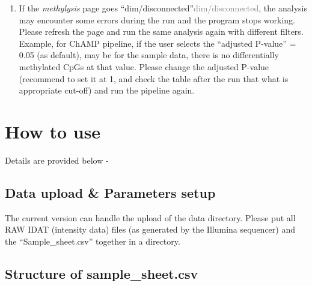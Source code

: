 \documentclass[
  a4paper,
  oneside,
  open=any]{scrreport}
\providecommand{\tightlist}{%
  \setlength{\itemsep}{0pt}\setlength{\parskip}{0pt}}\usepackage{longtable,booktabs,array}
\begin{document}
\begin{tcolorbox}[enhanced jigsaw, left=2mm, colback=white, breakable, leftrule=.75mm, coltitle=black, toprule=.15mm, rightrule=.15mm, colbacktitle=quarto-callout-tip-color!10!white, title=\textcolor{quarto-callout-tip-color}{\faLightbulb}\hspace{0.5em}{Tip}, opacitybacktitle=0.6, colframe=quarto-callout-tip-color-frame, bottomrule=.15mm, bottomtitle=1mm, toptitle=1mm, titlerule=0mm, opacityback=0, arc=.35mm]

\begin{enumerate}
\def\labelenumi{\arabic{enumi}.}
\setcounter{enumi}{1}
\tightlist
\item
  If the \emph{methylysis} page goes
  {``dim/disconnected''}\textcolor{gray}{dim/disconnected}, the analysis
  may encounter some errors during the run and the program stops
  working. Please refresh the page and run the same analysis again with
  different filters. Example, for ChAMP pipeline, if the user selects
  the ``adjusted P-value'' = 0.05 (as default), may be for the sample
  data, there is no differentially methylated CpGs at that value. Please
  change the adjusted P-value (recommend to set it at 1, and check the
  table after the run that what is appropriate cut-off) and run the
  pipeline again.
\end{enumerate}

\end{tcolorbox}

\hypertarget{how-to-use-1}{%
\section{How to use}\label{how-to-use-1}}

Details are provided below -

\hypertarget{data-upload-parameters-setup}{%
\subsection{Data upload \& Parameters
setup}\label{data-upload-parameters-setup}}

The current version can handle the upload of the data directory. Please
put all RAW IDAT (intensity data) files (as generated by the Illumina
sequencer) and the ``Sample\_sheet.csv'' together in a directory.

\hypertarget{structure-of-sample_sheet.csv}{%
\subsection{Structure of
sample\_sheet.csv}\label{structure-of-sample_sheet.csv}}
\end{document}
